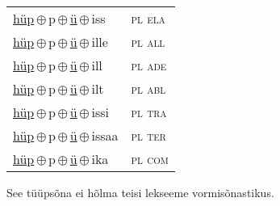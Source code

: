 \begin{minipage}{\textwidth}
\begin{sideways}
\begin{tabular}{l l}
\underline{hüp}\,$\oplus$\,p\,$\oplus$\,\underline{ü}\,$\oplus$\,iss & \textsc{ pl ela } \\
\underline{hüp}\,$\oplus$\,p\,$\oplus$\,\underline{ü}\,$\oplus$\,ille & \textsc{ pl all } \\
\underline{hüp}\,$\oplus$\,p\,$\oplus$\,\underline{ü}\,$\oplus$\,ill & \textsc{ pl ade } \\
\underline{hüp}\,$\oplus$\,p\,$\oplus$\,\underline{ü}\,$\oplus$\,ilt & \textsc{ pl abl } \\
\underline{hüp}\,$\oplus$\,p\,$\oplus$\,\underline{ü}\,$\oplus$\,issi & \textsc{ pl tra } \\
\underline{hüp}\,$\oplus$\,p\,$\oplus$\,\underline{ü}\,$\oplus$\,issaa & \textsc{ pl ter } \\
\underline{hüp}\,$\oplus$\,p\,$\oplus$\,\underline{ü}\,$\oplus$\,ika & \textsc{ pl com } \\
\end{tabular}
\end{sideways}
\label{tab:tüüpsõnamall-hüppü}

\end{minipage}

 
\vspace{1em}
\noindent See tüüpsõna ei hõlma teisi lekseeme vormi\-sõnastikus.
